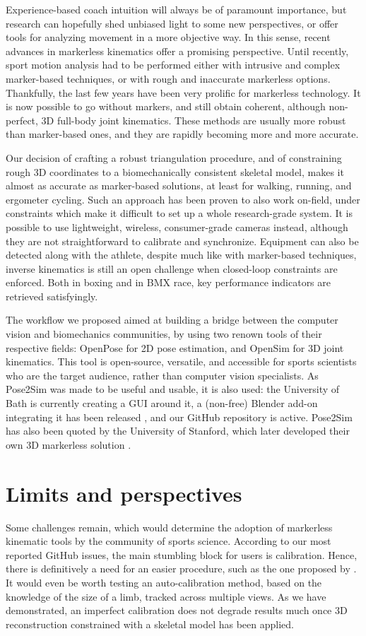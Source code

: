 Experience-based coach intuition will always be of paramount importance, but research can hopefully shed unbiased light to some new perspectives, or offer tools for analyzing movement in a more objective way. In this sense, recent advances in markerless kinematics offer a promising perspective. Until recently, sport motion analysis had to be performed either with intrusive and complex marker-based techniques, or with rough and inaccurate markerless options. Thankfully, the last few years have been very prolific for markerless technology. It is now possible to go without markers, and still obtain coherent, although non-perfect, 3D full-body joint kinematics. These methods are usually more robust than marker-based ones, and they are rapidly becoming more and more accurate. 

Our decision of crafting a robust triangulation procedure, and of constraining rough 3D coordinates to a biomechanically consistent skeletal model, makes it almost as accurate as marker-based solutions, at least for walking, running, and ergometer cycling. Such an approach has been proven to also work on-field, under constraints which make it difficult to set up a whole research-grade system. It is possible to use lightweight, wireless, consumer-grade cameras instead, although they are not straightforward to calibrate and synchronize. Equipment can also be detected along with the athlete, despite much like with marker-based techniques, inverse kinematics is still an open challenge when closed-loop constraints are enforced. Both in boxing and in BMX race, key performance indicators are retrieved satisfyingly. 

The workflow we proposed aimed at building a bridge between the computer vision and biomechanics communities, by using two renown tools of their respective fields: OpenPose for 2D pose estimation, and OpenSim for 3D joint kinematics. This tool is open-source, versatile, and accessible for sports scientists who are the target audience, rather than computer vision specialists. As Pose2Sim was made to be useful and usable, it is also used: the University of Bath is currently creating a GUI around it, a (non-free) Blender add-on integrating it has been released \cite{Barreto2022}, and our GitHub repository is active. Pose2Sim has also been quoted by the University of Stanford, which later developed their own 3D markerless solution \cite{Uhlrich2022}. 


\section*{Limits and perspectives}
Some challenges remain, which would determine the adoption of markerless kinematic tools by the community of sports science. According to our most reported GitHub issues, the main stumbling block for users is calibration. Hence, there is definitively a need for an easier procedure, such as the one proposed by \cite{Argus}. It would even be worth testing an auto-calibration method, based on the knowledge of the size of a limb, tracked across multiple views. As we have demonstrated, an imperfect calibration does not degrade results much once 3D reconstruction constrained with a skeletal model has been applied. 

